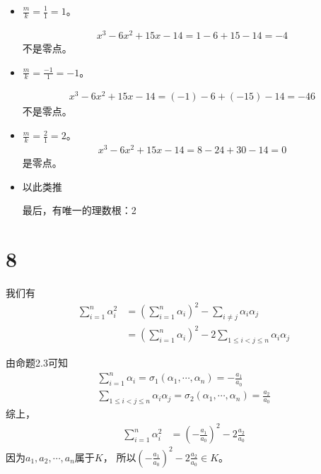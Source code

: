 \documentclass{article}
\begin{document}
\begin{itemize}
  \item $\frac{m}{k} = \frac{1}{1} = 1$。

        \begin{align*}
          x^3 - 6x^2 + 15x - 14 = 1 - 6 + 15 - 14 = -4
        \end{align*}
        不是零点。

  \item $\frac{m}{k} = \frac{-1}{1} = -1$。

        \begin{align*}
          x^3 - 6x^2 + 15x - 14 = (-1) - 6 + (-15) - 14 = -46
        \end{align*}
        不是零点。

  \item $\frac{m}{k} = \frac{2}{1} = 2$。
        \begin{align*}
          x^3 - 6x^2 + 15x - 14 = 8 - 24 + 30 - 14 = 0
        \end{align*}
        是零点。

  \item 以此类推


        最后，有唯一的理数根：2
\end{itemize}

\section*{8}

我们有
\begin{align*}
  \sum\limits_{i = 1}^n \alpha_i^2
   & = (\sum\limits_{i = 1}^n \alpha_i)^2
  - \sum\limits_{i \neq j} \alpha_i \alpha_j \\
   & = (\sum\limits_{i = 1}^n \alpha_i)^2
  - 2 \sum\limits_{1 \leq i < j \leq n} \alpha_i \alpha_j
\end{align*}

由命题2.3可知
\begin{align*}
  \sum\limits_{i = 1}^n \alpha_i = \sigma_1(\alpha_1, \cdots, \alpha_n) = - \frac{a_1}{a_0} \\
  \sum\limits_{1 \leq i < j \leq n} \alpha_i \alpha_j = \sigma_2(\alpha_1, \cdots, \alpha_n) = \frac{a_2}{a_0}
\end{align*}
综上，
\begin{align*}
  \sum\limits_{i = 1}^n \alpha_i^2
   & = (- \frac{a_1}{a_0})^2 - 2 \frac{a_2}{a_0}
\end{align*}
因为$a_1, a_2, \cdots , a_n$属于$K$，
所以$(- \frac{a_1}{a_0})^2 - 2 \frac{a_2}{a_0} \in K$。
\end{document}

